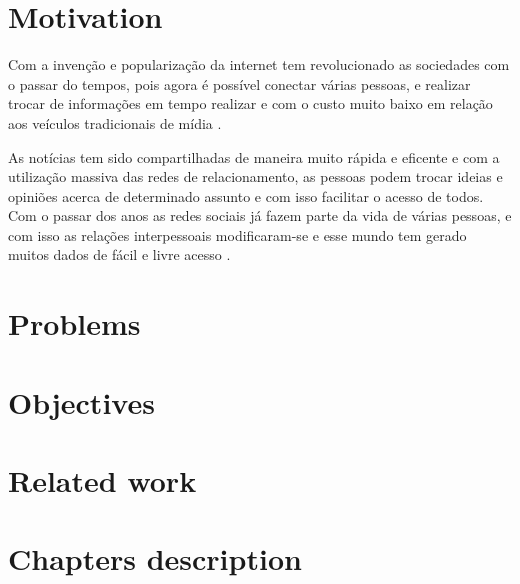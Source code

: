 
\section{Motivation}

Com a invenção e popularização da internet tem revolucionado as sociedades com o passar do tempos,
pois agora é possível conectar várias pessoas, e realizar trocar de informações em tempo realizar
e com o custo muito baixo em relação aos veículos tradicionais de mídia \cite{song2014analyzing}. 

As notícias tem sido compartilhadas de maneira muito rápida e eficente e com a utilização massiva das 
redes de relacionamento, as pessoas podem trocar ideias e opiniões acerca de determinado assunto e com isso facilitar
o acesso de todos. Com o passar dos anos as redes sociais já fazem parte da vida de várias pessoas, e com isso as relações 
interpessoais modificaram-se e esse mundo tem gerado muitos dados de fácil e livre acesso \cite{5194581}.

\section{Problems}

\section{Objectives}

\section{Related work}

\section{Chapters description}